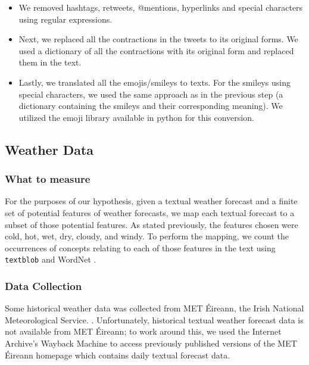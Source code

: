 \documentclass[a4paper,10pt]{article}
\begin{document}
    \begin{itemize}
        \item{
            We removed hashtags, retweets, @mentions, hyperlinks and special characters using regular expressions.
                    }
        \item{
            Next, we replaced all the contractions in the tweets to its original forms. We used a dictionary of all the contractions with its original form and replaced them in the text.
            
        }
        \item{
            Lastly, we translated all the emojis/smileys to texts. For the smileys using special characters, we used the same approach as in the previous step (a dictionary containing the smileys and their corresponding meaning). We utilized the emoji library available in python for this conversion.
        }\end{itemize}



    \subsection{Weather Data}

    \subsubsection{What to measure}

    For the purposes of our hypothesis, given a textual weather forecast and a finite set of potential features of weather forecasts, we map each textual forecast to a subset of those potential features. As stated previously, the features chosen were cold, hot, wet, dry, cloudy, and windy. To perform the mapping, we count the occurrences of concepts relating to each of those features in the text using \texttt{textblob} and WordNet .

    \subsubsection{Data Collection}

    Some historical weather data was collected from MET \'{E}ireann, the Irish National Meteorological Service. . Unfortunately, historical textual weather forecast data is not available from MET \'{E}ireann; to work around this, we used the Internet Archive's Wayback Machine  to access previously published versions of the MET \'{E}ireann homepage which contains daily textual forecast data.
\end{document}
